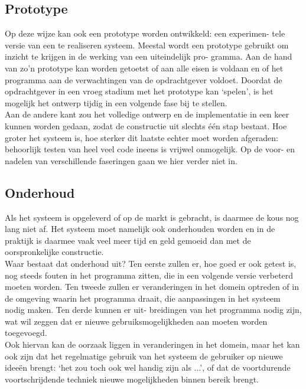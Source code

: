 \documentclass{article}
\begin{document}
	\subsection{Prototype}
	
	Op deze wijze kan ook een prototype worden ontwikkeld: een experimen-
	tele versie van een te realiseren systeem. Meestal wordt een prototype
	gebruikt om inzicht te krijgen in de werking van een uiteindelijk pro-
	gramma. Aan de hand van zo’n prototype kan worden getoetst of aan
	alle eisen is voldaan en of het programma aan de verwachtingen van de
	opdrachtgever voldoet. Doordat de opdrachtgever in een vroeg stadium
	met het prototype kan ‘spelen’, is het mogelijk het ontwerp tijdig in een
	volgende fase bij te stellen. \\
	
	Aan de andere kant zou het volledige ontwerp en de implementatie in
	een keer kunnen worden gedaan, zodat de constructie uit slechts één
	stap bestaat. Hoe groter het systeem is, hoe sterker dit laatste echter moet
	worden afgeraden: behoorlijk testen van heel veel code ineens is vrijwel
	onmogelijk. Op de voor- en nadelen van verschillende faseringen gaan
	we hier verder niet in. \\
	
	\subsection{Onderhoud}
	
	Als het systeem is opgeleverd of op de markt is gebracht, is daarmee
	de kous nog lang niet af. Het systeem moet namelijk ook onderhouden
	worden en in de praktijk is daarmee vaak veel meer tijd en geld gemoeid
	dan met de oorspronkelijke constructie. \\
	Waar bestaat dat onderhoud uit? Ten eerste zullen er, hoe goed er ook
	getest is, nog steeds fouten in het programma zitten, die in een volgende
	versie verbeterd moeten worden. Ten tweede zullen er veranderingen in
	het domein optreden of in de omgeving waarin het programma draait,
	die aanpassingen in het systeem nodig maken. Ten derde kunnen er uit-
	breidingen van het programma nodig zijn, wat wil zeggen dat er nieuwe
	gebruiksmogelijkheden aan moeten worden toegevoegd. \\
	Ook hiervan kan de oorzaak liggen in veranderingen in het domein,
	maar het kan ook zijn dat het regelmatige gebruik van het systeem de
	gebruiker op nieuwe ideeën brengt: ‘het zou toch ook wel handig zijn
	als ...’, of dat de voortdurende voortschrijdende techniek nieuwe
	mogelijkheden binnen bereik brengt. \\
	
\end{document}
